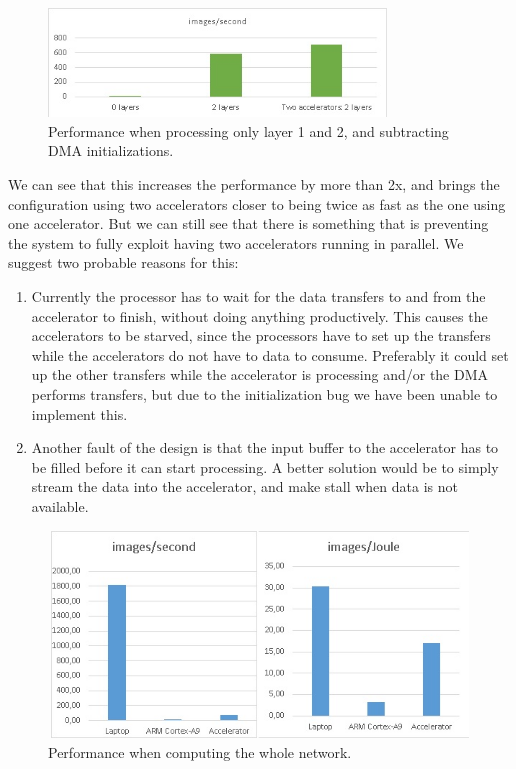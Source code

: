 \begin{figure}[h!]
	\centering
	\includegraphics[width=0.8\textwidth]{Figures/Results/performance_sub_dma_init}
	\caption[Accelerator performance, with DMA fix]{Performance when processing only layer 1 and 2, and subtracting DMA initializations.}
	\label{fig_performance_sub_init}
\end{figure}

 We can see that this increases the performance  by more than 2x, and brings the configuration using two accelerators closer to being twice as fast as the one using one accelerator. But we can still see that there is something that is preventing the system to fully exploit having two accelerators running in parallel. We suggest two probable reasons for this:

\begin{enumerate}
\item Currently the processor has to wait for the data transfers to and from the accelerator to finish, without doing anything productively. This causes the accelerators to be starved, since the processors have to set up the transfers while the accelerators do not have to data to consume. Preferably it could set up the other transfers while the accelerator is processing and/or the DMA performs transfers, but due to the initialization bug we have been unable to implement this. 
\item Another fault of the design is that the input buffer to the accelerator has to be filled before it can start processing. A better solution would be to simply stream the data into the accelerator, and make stall when data is not available. 
\end{enumerate}


\begin{figure}[h!]
	\centering
	\includegraphics[width=1.0\textwidth,height=5.5cm]{Figures/Results/performance_whole_system}
	\caption[Performance comparison]{Performance when computing the whole network.}
	\label{fig_performance_whole_system}
\end{figure}


